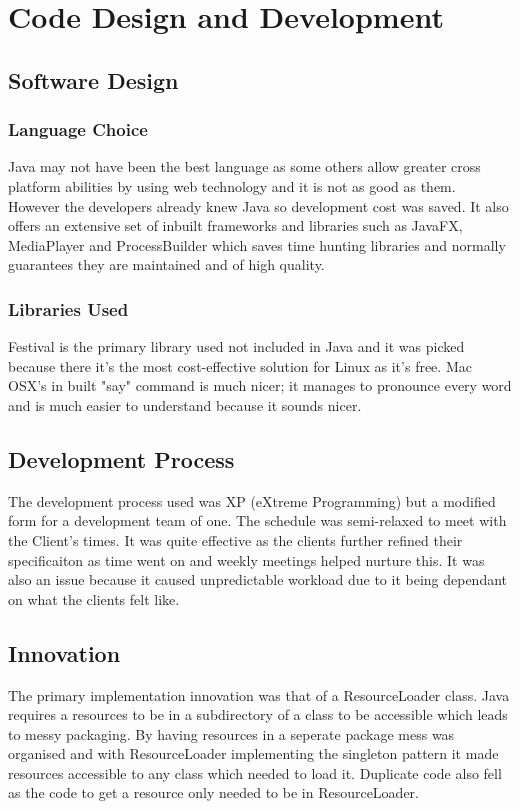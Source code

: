 \documentclass[conference]{IEEEtran}
\begin{document}
\section{Code Design and Development}
	\subsection{Software Design}
		\subsubsection{Language Choice}
			Java may not have been the best language as some others allow greater cross platform abilities by using web technology and it is not as good as them. However the developers already knew Java so development cost was saved. It also offers an extensive set of inbuilt frameworks and libraries such as JavaFX, MediaPlayer and ProcessBuilder which saves time hunting libraries and normally guarantees they are maintained and of high quality.
		\subsubsection{Libraries Used}
			Festival is the primary library used not included in Java and it was picked because there it's the most cost-effective solution for Linux as it's free. Mac OSX's in built "say" command is much nicer; it manages to pronounce every word and is much easier to understand because it sounds nicer.
	\subsection{Development Process}
		The development process used was XP (eXtreme Programming) but a modified form for a development team of one. The schedule was semi-relaxed to meet with the Client's times. It was quite effective as the clients further refined their specificaiton as time went on and weekly meetings helped nurture this. It was also an issue because it caused unpredictable workload due to it being dependant on what the clients felt like.
	\subsection{Innovation}
		The primary implementation innovation was that of a ResourceLoader class. Java requires a resources to be in a subdirectory of a class to be accessible which leads to messy packaging. By having resources in a seperate package mess was organised and with ResourceLoader implementing the singleton pattern it made resources accessible to any class which needed to load it. Duplicate code also fell as the code to get a resource only needed to be in ResourceLoader.
\end{document}
